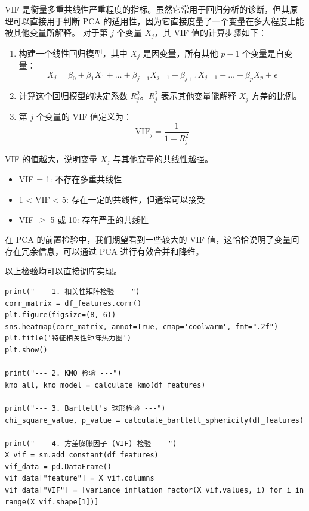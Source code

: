 \begin{definition}[方差膨胀因子]
    VIF 是衡量多重共线性严重程度的指标。虽然它常用于回归分析的诊断，但其原理可以直接用于判断 PCA 的适用性，因为它直接度量了一个变量在多大程度上能被其他变量所解释。
    对于第 $j$ 个变量 $X_j$，其 VIF 值的计算步骤如下：
    \begin{enumerate}
        \item 构建一个线性回归模型，其中 $X_j$ 是因变量，所有其他 $p-1$ 个变量是自变量：
              $$ X_j = \beta_0 + \beta_1 X_1 + \dots + \beta_{j-1} X_{j-1} + \beta_{j+1} X_{j+1} + \dots + \beta_p X_p + \epsilon $$
        \item 计算这个回归模型的决定系数 $R_j^2$。$R_j^2$ 表示其他变量能解释 $X_j$ 方差的比例。
        \item 第 $j$ 个变量的 VIF 值定义为：
              \begin{equation}
                  \text{VIF}_j = \frac{1}{1 - R_j^2}
              \end{equation}
    \end{enumerate}

    VIF 的值越大，说明变量 $X_j$ 与其他变量的共线性越强。
    \begin{itemize}
        \item VIF = 1: 不存在多重共线性
        \item 1 < VIF < 5: 存在一定的共线性，但通常可以接受
        \item VIF $\ge$ 5 或 10: 存在严重的共线性
    \end{itemize}
    在 PCA 的前置检验中，我们期望看到一些较大的 VIF 值，这恰恰说明了变量间存在冗余信息，可以通过 PCA 进行有效合并和降维。
\end{definition}

以上检验均可以直接调库实现。

\begin{lstlisting}[style=python]
print("--- 1. 相关性矩阵检验 ---")
corr_matrix = df_features.corr()
plt.figure(figsize=(8, 6))
sns.heatmap(corr_matrix, annot=True, cmap='coolwarm', fmt=".2f")
plt.title('特征相关性矩阵热力图')
plt.show()

print("--- 2. KMO 检验 ---")
kmo_all, kmo_model = calculate_kmo(df_features)

print("--- 3. Bartlett's 球形检验 ---")
chi_square_value, p_value = calculate_bartlett_sphericity(df_features)

print("--- 4. 方差膨胀因子 (VIF) 检验 ---")
X_vif = sm.add_constant(df_features)
vif_data = pd.DataFrame()
vif_data["feature"] = X_vif.columns
vif_data["VIF"] = [variance_inflation_factor(X_vif.values, i) for i in range(X_vif.shape[1])]
\end{lstlisting}

